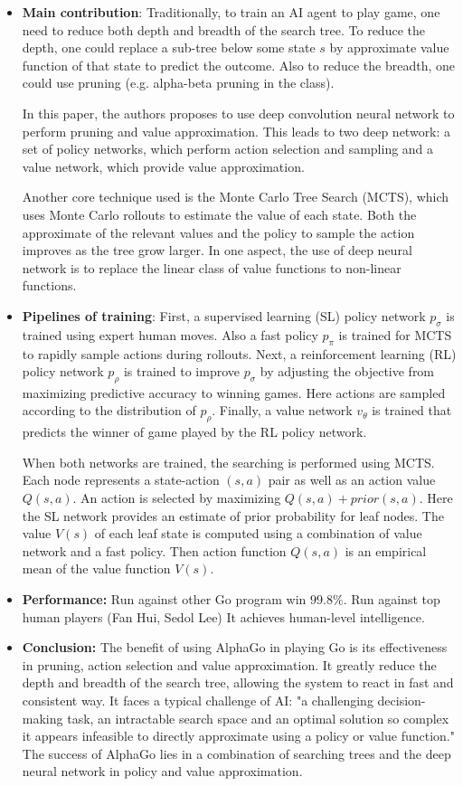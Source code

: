 \documentclass[11pt]{article}
\begin{document}
\begin{itemize}
\item \textbf{Main contribution}:  Traditionally, to train an AI agent to play game, one need to reduce both depth and breadth of the search tree. To reduce the depth, one could replace a sub-tree below some state $s$ by approximate value function of that state to predict the outcome. Also to reduce the breadth, one could use pruning (e.g. alpha-beta pruning in the class).

 In this paper, the authors proposes to use deep convolution neural network to perform pruning and value approximation. This leads to two deep network: a set of policy networks, which perform action selection and sampling and a value network, which provide value approximation. 
 
 Another core technique used is the Monte Carlo Tree Search (MCTS), which uses Monte Carlo rollouts to estimate the value of each state. Both the approximate of the relevant values and the policy to sample the action improves as the tree grow larger. In one aspect, the use of deep neural network is to replace the linear class of value functions to non-linear functions. 
 
 
 \item \textbf{Pipelines of training}:  First, a supervised learning (SL) policy network $p_\sigma$ is trained using expert human moves. Also a fast policy $p_{\pi}$ is trained for MCTS to rapidly sample actions during rollouts. Next, a reinforcement learning (RL) policy network $p_{\rho}$ is trained to improve $p_{\sigma}$ by adjusting the objective from maximizing predictive accuracy to winning games. Here actions are sampled according to the distribution of $p_{\rho}$. Finally, a value network $v_{\theta}$  is trained that predicts the winner of game played by the RL policy network. 
 
 When both networks are trained, the searching is performed using MCTS. Each node represents a state-action $(s,a)$ pair as well as an action value $Q(s,a)$. An action is selected by maximizing $Q(s,a) + prior(s,a)$. Here the SL network provides an estimate of prior probability for leaf nodes. The value  $V(s)$ of each leaf state is computed using a combination of value network and a fast policy.  Then action function $Q(s,a)$ is an empirical mean of the value function $V(s)$.
 
 \item \textbf{Performance:}  Run against other Go program win $99.8\%$. Run against top human players (Fan Hui, Sedol Lee) It achieves human-level intelligence. 
 
 \item \textbf{Conclusion:} The benefit of using AlphaGo in playing Go is its effectiveness in pruning, action selection and value approximation. It greatly reduce the depth and breadth of the search tree, allowing the system to react in fast and consistent way. It faces a typical challenge of AI: "a challenging decision-making task, an intractable search space and an optimal solution so complex it appears infeasible to directly approximate using a policy or value function." The success of AlphaGo lies in a combination of searching trees and the deep neural network in policy and value approximation.  
\end{itemize}
\end{document}
